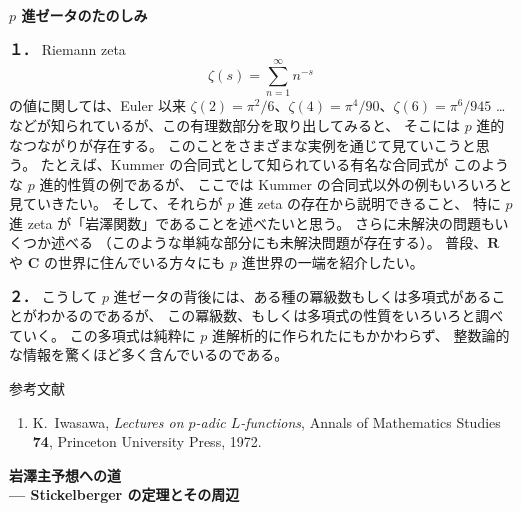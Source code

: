 \documentclass[uplatex,dvipdfmx]{jlreq}
\begin{document}
\newpage

\begin{center}
  {\Large\bfseries $p$ 進ゼータのたのしみ}
\end{center}

\bigskip
\hspace*{\fill}{\large\bfseries 栗原　将人（都立大・理）}

\bigskip

\noindent\textbf{１．}
Riemann zeta
\[
  \zeta(s) = \sum_{n=1}^{\infty} n^{-s}
\]
の値に関しては、Euler 以来
$\zeta(2) = \pi^2/6$、$\zeta(4) = \pi^4/90$、$\zeta(6) = \pi^6/945$ \ldots
などが知られているが、この有理数部分を取り出してみると、
そこには $p$ 進的なつながりが存在する。
このことをさまざまな実例を通じて見ていこうと思う。
たとえば、Kummer の合同式として知られている有名な合同式が
このような $p$ 進的性質の例であるが、
ここでは Kummer の合同式以外の例もいろいろと見ていきたい。
そして、それらが $p$ 進 zeta の存在から説明できること、
特に $p$ 進 zeta が「岩澤関数」であることを述べたいと思う。
さらに未解決の問題もいくつか述べる
（このような単純な部分にも未解決問題が存在する）。
普段、$\mathbf{R}$ や $\mathbf{C}$ の世界に住んでいる方々にも
$p$ 進世界の一端を紹介したい。

\medskip

\noindent\textbf{２．}
こうして $p$ 進ゼータの背後には、ある種の冪級数もしくは多項式があることがわかるのであるが、
この冪級数、もしくは多項式の性質をいろいろと調べていく。
この多項式は純粋に $p$ 進解析的に作られたにもかかわらず、
整数論的な情報を驚くほど多く含んでいるのである。

\vspace{1pc}

\begin{center}
  \textsc{参考文献}
\end{center}
\begin{enumerate}
  \item K.~Iwasawa,
        \textit{Lectures on $p$-adic $L$-functions},
        Annals of Mathematics Studies \textbf{74},
        Princeton University Press, 1972.
\end{enumerate}

\newpage

\begin{center}
  {\Large\bfseries 岩澤主予想への道\\
  \normalsize --- Stickelberger の定理とその周辺}
\end{center}
\end{document}
